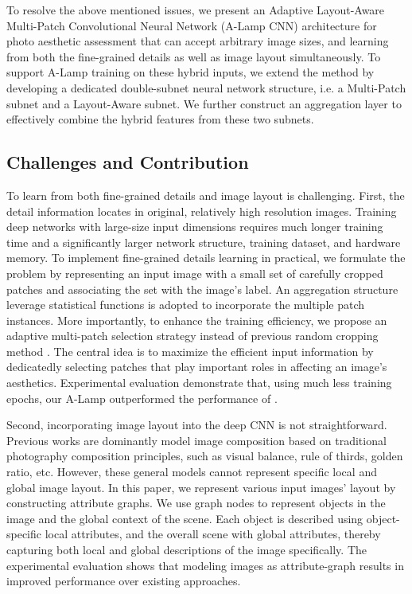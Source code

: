 \documentclass[10pt,twocolumn,letterpaper]{article}
\begin{document}
To resolve the above mentioned issues, we present an Adaptive Layout-Aware Multi-Patch Convolutional Neural Network (A-Lamp CNN) architecture for photo aesthetic assessment that can accept arbitrary image sizes, and learning from both the fine-grained details as well as image layout simultaneously.
To support A-Lamp training on these hybrid inputs, we extend the method by developing a dedicated double-subnet neural network structure, i.e. a Multi-Patch subnet and a Layout-Aware subnet. We further construct an aggregation layer to effectively combine the hybrid features from these two subnets.

\subsection{Challenges and Contribution} \label{challenge}
To learn from both fine-grained details and image layout is challenging.
First, the detail information locates in original, relatively high resolution images. Training deep networks with large-size input dimensions requires much longer training time and a significantly larger network structure, training dataset, and hardware memory. To implement fine-grained details learning in practical, we formulate the problem by representing an input image with a small set of carefully cropped patches and associating the set with the image's label. An aggregation structure leverage statistical functions is adopted to incorporate the multiple patch instances.
More importantly, to enhance the training efficiency, we propose an adaptive multi-patch selection strategy instead of previous random cropping method \cite{Lu:2015:ICCV}. The central idea is to maximize the efficient input information by dedicatedly selecting patches that play important roles in affecting an image's aesthetics. Experimental evaluation demonstrate that, using much less training epochs, our A-Lamp outperformed the performance of \cite{Lu:2015:ICCV}. 

Second, incorporating image layout into the deep CNN is not straightforward. Previous works are dominantly model image composition based on traditional photography composition principles, such as visual balance, rule of thirds, golden ratio, etc. However, these general models cannot represent specific local and global image layout.
In this paper, we represent various input images' layout by constructing attribute graphs. We use graph nodes to represent objects in the image and the global context of the scene. Each object is described using object-specific local attributes, and the overall scene with global attributes, thereby capturing both local and global descriptions of the image specifically. 
The experimental evaluation shows that modeling images as attribute-graph results in improved performance over existing approaches.
\end{document}
